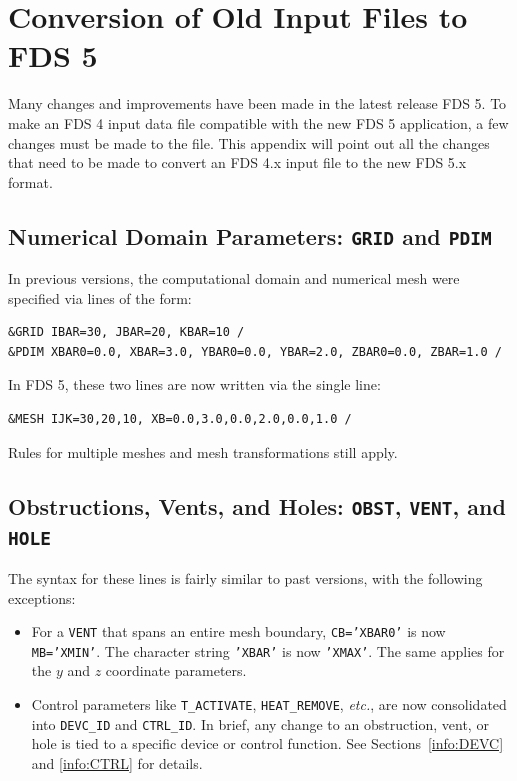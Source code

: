 \documentclass[11pt]{book}
\newcommand{\ct}{\tt\small}
\begin{document}
\vfill





\chapter{Conversion of Old Input Files to FDS 5}

Many changes and improvements have been made in the latest release FDS 5.
To make an FDS 4 input data file compatible with the new FDS 5 application,
a few changes must be made to the file.
This appendix will point out all the changes that need to be made to convert
an FDS 4.x input file to the new FDS 5.x format.

\section{Numerical Domain Parameters: \texorpdfstring{{\tt GRID}}{GRID} and \texorpdfstring{{\tt PDIM}}{PDIM} }

In previous versions, the computational domain and numerical mesh were specified via lines of the form:

\footnotesize
\begin{verbatim}
&GRID IBAR=30, JBAR=20, KBAR=10 /
&PDIM XBAR0=0.0, XBAR=3.0, YBAR0=0.0, YBAR=2.0, ZBAR0=0.0, ZBAR=1.0 /
\end{verbatim} \normalsize

\noindent
In FDS 5, these two lines are now written via the single line:

\footnotesize
\begin{verbatim}
&MESH IJK=30,20,10, XB=0.0,3.0,0.0,2.0,0.0,1.0 /
\end{verbatim} \normalsize

\noindent
Rules for multiple meshes and mesh transformations still apply.

\section{Obstructions, Vents, and Holes: \texorpdfstring{{\tt OBST}}{OBST}, \texorpdfstring{{\tt VENT}}{VENT}, and \texorpdfstring{{\tt HOLE}}{HOLE}}

The syntax for these lines is fairly similar to past versions, with the following exceptions:
\begin{itemize}
\item For a {\ct VENT} that spans an entire mesh boundary, {\ct CB='XBAR0'} is now {\ct MB='XMIN'}. The character string
{\ct 'XBAR'} is now {\ct 'XMAX'}. The same applies for the $y$ and $z$ coordinate parameters.
\item Control parameters like {\ct T\_ACTIVATE}, {\ct HEAT\_REMOVE}, {\em etc.}, are now consolidated into {\ct DEVC\_ID} and
{\ct CTRL\_ID}. In brief,
any change to an obstruction, vent, or hole is tied to a specific device or control function. See Sections~\ref{info:DEVC} and
\ref{info:CTRL} for details.
\end{itemize}
\end{document}
